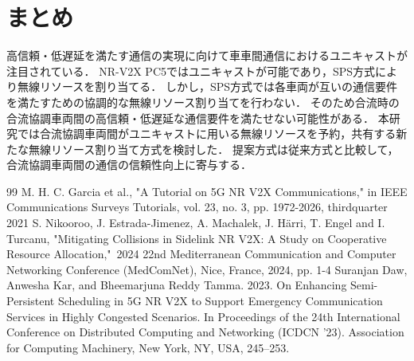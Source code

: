 \documentclass[a4paper,10pt,twocolumn,uplatex]{jsarticle}
\begin{document}
\section{まとめ}
高信頼・低遅延を満たす通信の実現に向けて車車間通信におけるユニキャストが注目されている．
NR-V2X PC5ではユニキャストが可能であり，SPS方式により無線リソースを割り当てる．
しかし，SPS方式では各車両が互いの通信要件を満たすための協調的な無線リソース割り当てを行わない．
そのため合流時の合流協調車両間の高信頼・低遅延な通信要件を満たせない可能性がある．
本研究では合流協調車両間がユニキャストに用いる無線リソースを予約，共有する新たな無線リソース割り当て方式を検討した．
提案方式は従来方式と比較して，合流協調車両間の通信の信頼性向上に寄与する．


\footnotesize{
  \begin{thebibliography}{99}
    M. H. C. Garcia et al., "A Tutorial on 5G NR V2X Communications," in IEEE Communications Surveys Tutorials, vol. 23, no. 3, pp. 1972-2026, thirdquarter 2021
    S. Nikooroo, J. Estrada-Jimenez, A. Machalek, J. Härri, T. Engel and I. Turcanu, "Mitigating Collisions in Sidelink NR V2X: A Study on Cooperative Resource Allocation," 2024 22nd Mediterranean Communication and Computer Networking Conference (MedComNet), Nice, France, 2024, pp. 1-4
    Suranjan Daw, Anwesha Kar, and Bheemarjuna Reddy Tamma. 2023. On Enhancing Semi-Persistent Scheduling in 5G NR V2X to Support Emergency Communication Services in Highly Congested Scenarios. In Proceedings of the 24th International Conference on Distributed Computing and Networking (ICDCN '23). Association for Computing Machinery, New York, NY, USA, 245–253.
  \end{thebibliography}
}

% 
% 

\end{document}
